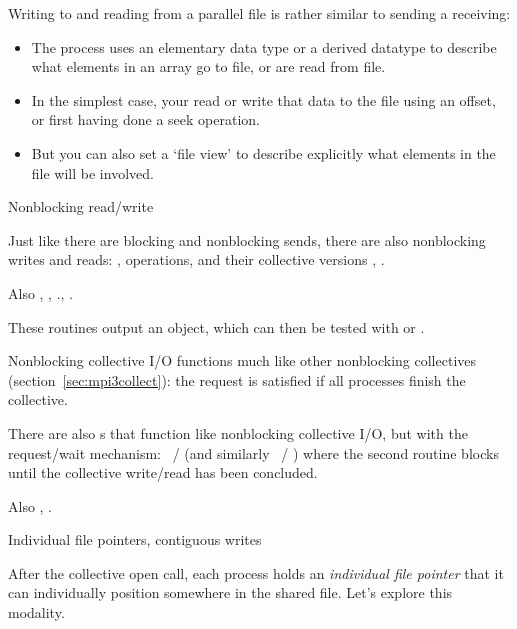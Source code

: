 Writing to and reading from a parallel file is rather similar to
sending a receiving:
\begin{itemize}
\item The process uses an elementary data type or a derived datatype
  to describe what elements in an array go to file, or are read from
  file.
\item In the simplest case, your read or write that data to the file using an
  offset, or first having done a seek operation.
\item But you can also set a `file view' to describe explicitly what
  elements in the file will be involved.
\end{itemize}

 {Nonblocking read/write}

Just like there are blocking and nonblocking sends, there are also
nonblocking writes and reads:
,
operations,
and their collective versions
,
.

Also 
,
,
.,
.

These routines output an  object,
which can then be tested with
 or .

Nonblocking collective I/O functions
much like other nonblocking collectives
(section~\ref{sec:mpi3collect}):
the request is satisfied if all processes finish the collective.

There are also s
that function like nonblocking collective I/O, but with the request/wait mechanism:
~/
(and similarly
~/
)
where the second routine blocks until the collective write/read
has been concluded.

Also , .

 {Individual file pointers, contiguous writes}
\label{sec:mpi-filepoint}

After the collective open call, each process holds an
\emph{individual file pointer}
that it can individually position somewhere in the shared file.
Let's explore this modality.

